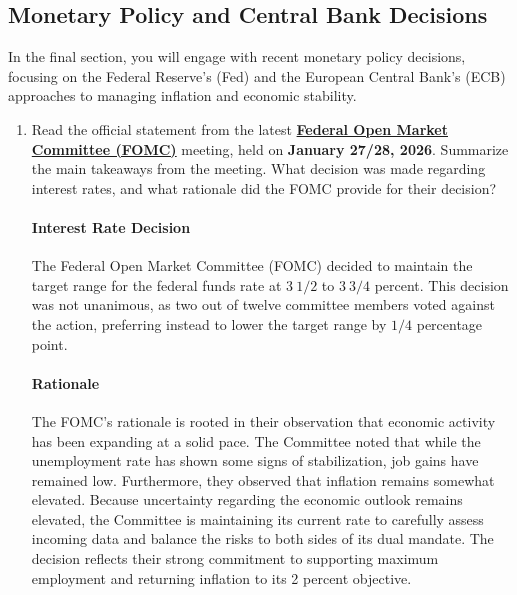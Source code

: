 \documentclass[dvipsnames,11pt]{article}
\begin{document}
    \subsection{Monetary Policy and Central Bank Decisions}

        In the final section, you will engage with recent monetary policy decisions, focusing on the Federal Reserve's (Fed) and the European Central Bank's (ECB) approaches to managing inflation and economic stability.

        \begin{enumerate}
            \item Read the official statement from the latest \textbf{\href{https://www.federalreserve.gov/monetarypolicy/fomcpressconf20260128.htm}{Federal Open Market Committee (FOMC)}} meeting, held on \textbf{January 27/28, 2026}. Summarize the main takeaways from the meeting. What decision was made regarding interest rates, and what rationale did the FOMC provide for their decision?

            \begin{solution}

                \paragraph{Interest Rate Decision}
                    The Federal Open Market Committee (FOMC) decided to maintain the target range for the federal funds rate at \(3 \ 1/2\) to \(3 \ 3/4\) percent. This decision was not unanimous, as two out of twelve committee members voted against the action, preferring instead to lower the target range by \(1/4\) percentage point.

                \paragraph{Rationale}
                    The FOMC's rationale is rooted in their observation that economic activity has been expanding at a solid pace. The Committee noted that while the unemployment rate has shown some signs of stabilization, job gains have remained low. Furthermore, they observed that inflation remains somewhat elevated. Because uncertainty regarding the economic outlook remains elevated, the Committee is maintaining its current rate to carefully assess incoming data and balance the risks to both sides of its dual mandate. The decision reflects their strong commitment to supporting maximum employment and returning inflation to its 2 percent objective.
            \end{solution}
            

\end{enumerate}
\end{document}

